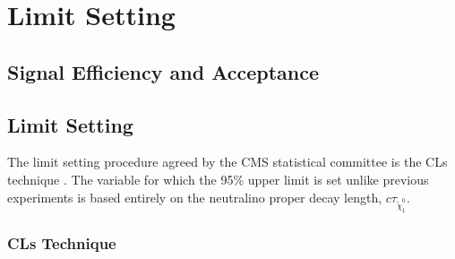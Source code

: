 \chapter{Limit Setting}
\label{Limit_Setting}
\section{Signal Efficiency and Acceptance}


\section{Limit Setting}
The limit setting procedure agreed by the CMS statistical committee is the CLs technique \cite{CLS}.
The variable for which the 95\% upper limit is set unlike previous experiments is based entirely on the neutralino proper decay length, $c\tau_{\tilde{\chi}^{0}_{1}}$. 

\subsection{CLs Technique}


